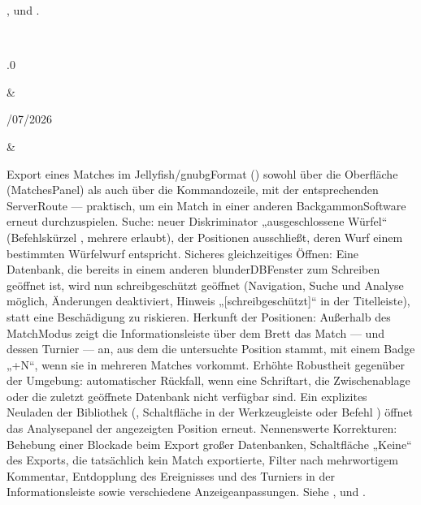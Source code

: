 \documentclass[letterpaper,10pt,german]{sphinxmanual}
\begin{document}
\begin{savenotes}
\begin{longtable}{}
\begin{varwidth}[t]{}
{\hyperref[\detokenize{mode_headless:headless}]{}}, {\hyperref[\detokenize{cmd_mode:cmd-mode}]{}} und {\hyperref[\detokenize{telecharge_install:telecharge-install}]{}}.
\sphinxbeforeendvarwidth
\end{varwidth}%
\\
\sphinxhline\begin{varwidth}[t]{}
.0
\sphinxbeforeendvarwidth
\end{varwidth}%
&\begin{varwidth}[t]{}
/07/2026
\sphinxbeforeendvarwidth
\end{varwidth}%
&\begin{varwidth}[t]{}
\sphinxAtStartPar
Export eines Matches im Jellyfish/gnubg\sphinxhyphen{}Format () sowohl über die Oberfläche (Matches\sphinxhyphen{}Panel) als auch über die Kommandozeile, mit der entsprechenden Server\sphinxhyphen{}Route — praktisch, um ein Match in einer anderen Backgammon\sphinxhyphen{}Software erneut durchzuspielen. Suche: neuer Diskriminator „ausgeschlossene Würfel“ (Befehlskürzel , mehrere erlaubt), der Positionen ausschließt, deren Wurf einem bestimmten Würfelwurf entspricht. Sicheres gleichzeitiges Öffnen: Eine Datenbank, die bereits in einem anderen blunderDB\sphinxhyphen{}Fenster zum Schreiben geöffnet ist, wird nun schreibgeschützt geöffnet (Navigation, Suche und Analyse möglich, Änderungen deaktiviert, Hinweis „{[}schreibgeschützt{]}“ in der Titelleiste), statt eine Beschädigung zu riskieren. Herkunft der Positionen: Außerhalb des Match\sphinxhyphen{}Modus zeigt die Informationsleiste über dem Brett das Match — und dessen Turnier — an, aus dem die untersuchte Position stammt, mit einem Badge „+N“, wenn sie in mehreren Matches vorkommt. Erhöhte Robustheit gegenüber der Umgebung: automatischer Rückfall, wenn eine Schriftart, die Zwischenablage oder die zuletzt geöffnete Datenbank nicht verfügbar sind. Ein explizites Neuladen der Bibliothek (, Schaltfläche in der Werkzeugleiste oder Befehl ) öffnet das Analysepanel der angezeigten Position erneut. Nennenswerte Korrekturen: Behebung einer Blockade beim Export großer Datenbanken, Schaltfläche „Keine“ des Exports, die tatsächlich kein Match exportierte, Filter nach mehrwortigem Kommentar, Entdopplung des Ereignisses und des Turniers in der Informationsleiste sowie verschiedene Anzeigeanpassungen. Siehe {\hyperref[\detokenize{cmd_mode:cmd-mode}]{}}, {\hyperref[\detokenize{manuel:panneau-matchs}]{}} und {\hyperref[\detokenize{manuel:manuel}]{}}.

\end{varwidth}
\end{longtable}
\end{savenotes}
\end{document}
